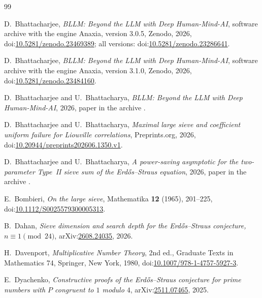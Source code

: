 \documentclass[aps,prd,twocolumn,superscriptaddress,nofootinbib,longbibliography,floatfix,showkeys,nobalancelastpage,amsmath,amssymb,10pt]{revtex4-2}
\theoremstyle{plain}
\theoremstyle{definition}
\theoremstyle{plain}
\begin{document}
\makeatletter
\def\bibsection{\par\begingroup\baselineskip26\p@\bib@device{\hsize}{72\p@}\endgroup\nobreak\@nobreaktrue\addvspace{19\p@}}
\makeatother
\begingroup\raggedright
\begin{thebibliography}{99}

D.~Bhattacharjee, \emph{BLLM: Beyond the LLM with Deep Human-Mind-AI}, software archive with the engine Anaxia, version 3.0.5, Zenodo, 2026, doi:\href{https://doi.org/10.5281/zenodo.23469389}{10.5281/zenodo.23469389}; all versions: doi:\href{https://doi.org/10.5281/zenodo.23286641}{10.5281/zenodo.23286641}.

D.~Bhattacharjee, \emph{BLLM: Beyond the LLM with Deep Human-Mind-AI}, software archive with the engine Anaxia, version 3.1.0, Zenodo, 2026, doi:\href{https://doi.org/10.5281/zenodo.23484160}{10.5281/zenodo.23484160}.

D.~Bhattacharjee and U.~Bhattacharya, \emph{BLLM: Beyond the LLM with Deep Human-Mind-AI}, 2026, paper in the archive \cite{Ana}.

D.~Bhattacharjee and U.~Bhattacharya, \emph{Maximal large sieve and coefficient uniform failure for Liouville correlations}, Preprints.org, 2026, doi:\href{https://doi.org/10.20944/preprints202606.1350.v1}{10.20944/preprints202606.1350.v1}.

D.~Bhattacharjee and U.~Bhattacharya, \emph{A power-saving asymptotic for the two-parameter Type~II sieve sum of the Erd\H{o}s--Straus equation}, 2026, paper in the archive \cite{Zen}.

E.~Bombieri, \emph{On the large sieve}, Mathematika \textbf{12} (1965), 201--225, doi:\href{https://doi.org/10.1112/S0025579300005313}{10.1112/S0025579300005313}.

B.~Dahan, \emph{Sieve dimension and search depth for the Erd\H{o}s--Straus conjecture, $n\equiv1\pmod{24}$}, arXiv:\href{https://arxiv.org/abs/2608.24035}{2608.24035}, 2026.

H.~Davenport, \emph{Multiplicative Number Theory}, 2nd ed., Graduate Texts in Mathematics 74, Springer, New York, 1980, doi:\href{https://doi.org/10.1007/978-1-4757-5927-3}{10.1007/978-1-4757-5927-3}.

E.~Dyachenko, \emph{Constructive proofs of the Erd\H{o}s--Straus conjecture for prime numbers with $P$ congruent to $1$ modulo $4$}, arXiv:\href{https://arxiv.org/abs/2511.07465}{2511.07465}, 2025.


\end{thebibliography}
\end{document}
